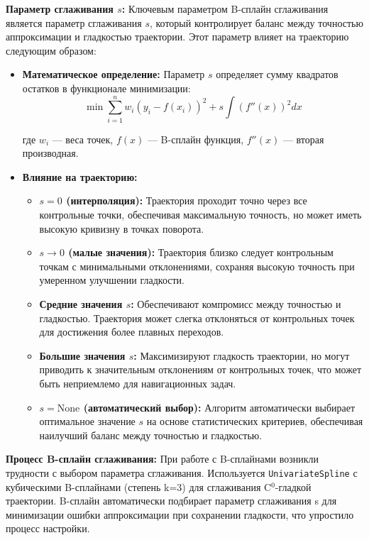 \textbf{Параметр сглаживания $s$:} Ключевым параметром B-сплайн сглаживания является параметр сглаживания $s$, который контролирует баланс между точностью аппроксимации и гладкостью траектории. Этот параметр влияет на траекторию следующим образом:

\begin{itemize}
\item \textbf{Математическое определение:} Параметр $s$ определяет сумму квадратов остатков в функционале минимизации:
$$\min \sum_{i=1}^{n} w_i (y_i - f(x_i))^2 + s \int (f''(x))^2 dx$$

где $w_i$ --- веса точек, $f(x)$ --- B-сплайн функция, $f''(x)$ --- вторая производная.

\item \textbf{Влияние на траекторию:}
\begin{itemize}
\item \textbf{$s = 0$ (интерполяция):} Траектория проходит точно через все контрольные точки, обеспечивая максимальную точность, но может иметь высокую кривизну в точках поворота.

\item \textbf{$s \to 0$ (малые значения):} Траектория близко следует контрольным точкам с минимальными отклонениями, сохраняя высокую точность при умеренном улучшении гладкости.

\item \textbf{Средние значения $s$:} Обеспечивают компромисс между точностью и гладкостью. Траектория может слегка отклоняться от контрольных точек для достижения более плавных переходов.

\item \textbf{Большие значения $s$:} Максимизируют гладкость траектории, но могут приводить к значительным отклонениям от контрольных точек, что может быть неприемлемо для навигационных задач.

\item \textbf{$s = \text{None}$ (автоматический выбор):} Алгоритм автоматически выбирает оптимальное значение $s$ на основе статистических критериев, обеспечивая наилучший баланс между точностью и гладкостью.
\end{itemize}
\end{itemize}

\textbf{Процесс B-сплайн сглаживания:} При работе с B-сплайнами возникли трудности с выбором параметра сглаживания. Используется \texttt{UnivariateSpline} с кубическими B-сплайнами (степень k=3) для сглаживания C$^0$-гладкой траектории. B-сплайн автоматически подбирает параметр сглаживания s для минимизации ошибки аппроксимации при сохранении гладкости, что упростило процесс настройки.

